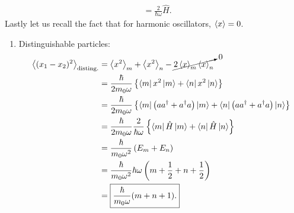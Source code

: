 \documentclass[11pt]{article}
\begin{document}
\begin{enumerate}[label=\textbf{\arabic*}.]
\begin{enumerate}
\begin{align*}
                &= \frac{2}{\hbar\omega} \hat{H} \text{.}
            \end{align*}
            Lastly let us recall the fact that for harmonic oscillators, $\expval{x} = 0$.
            \begin{enumerate}[label=(\roman*)]
                \item Distinguishable particles:
                    \begin{align*}
                        \expval{(x_1 - x_2)^2}_\mathrm{disting.} &= \expval{x^2}_m + \expval{x^2}_n - \cancelto{0}{2\expval{x}_m \expval{x}_n} \\
                        &= \frac{\hbar}{2m_0\omega}\left\{ \bra{m}x^2 \ket{m} + \bra{n}x^2 \ket{n} \right\} \\
                        &= \frac{\hbar}{2m_0 \omega}\left\{ \bra{m}\left(aa^\dagger + a^\dagger a\right)\ket{m} + \bra{n}\left(aa^\dagger + a^\dagger a\right)\ket{n} \right\} \\
                        &= \frac{\hbar}{2m_0\omega}\frac{2}{\hbar\omega} \left\{\bra{m}\hat{H}\ket{m} + \bra{n}\hat{H}\ket{n}\right\} \\
                        &= \frac{\hbar}{m_0 \omega^2} \left( E_m + E_n \right) \\
                        &= \frac{\hbar}{m_0 \omega^2} \hbar\omega \left(m + \frac{1}{2} + n + \frac{1}{2}\right) \\
                        &= \boxed{\frac{\hbar}{m_0\omega}(m + n + 1)  \text{.}}
                    \end{align*}


\end{enumerate}
\end{enumerate}
\end{enumerate}
\end{document}

